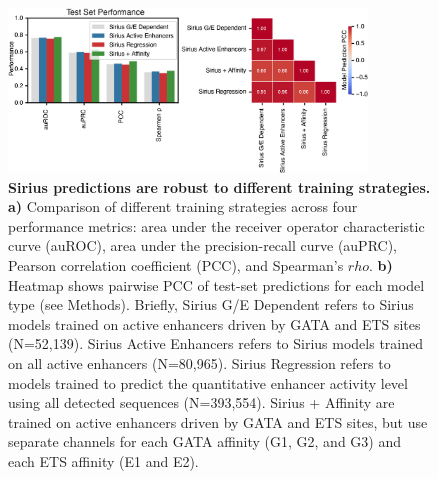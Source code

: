 \begin{figure}[p]
    \centering
    \includegraphics[width=0.85\textwidth]{2_figures-and-files/SuppFig7.png}
    \caption[Sirius predictions are robust to different training strategies.]{\textbf{Sirius predictions are robust to different training strategies.} \textbf{a)} Comparison of different training strategies across four performance metrics: area under the receiver operator characteristic curve (auROC), area under the precision-recall curve (auPRC), Pearson correlation coefficient (PCC), and Spearman’s $rho$. \textbf{b)} Heatmap shows pairwise PCC of test-set predictions for each model type (see Methods). Briefly, Sirius G/E Dependent refers to Sirius models trained on active enhancers driven by GATA and ETS sites (N=52,139). Sirius Active Enhancers refers to Sirius models trained on all active enhancers (N=80,965). Sirius Regression refers to models trained to predict the quantitative enhancer activity level using all detected sequences (N=393,554). Sirius + Affinity are trained on active enhancers driven by GATA and ETS sites, but use separate channels for each GATA affinity (G1, G2, and G3) and each ETS affinity (E1 and E2).}
    \label{fig:supplementary_7}
\end{figure}

